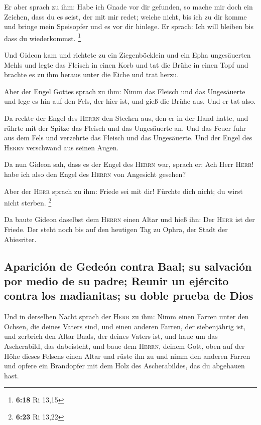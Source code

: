  Er aber sprach zu ihm: Habe ich Gnade vor dir gefunden,
so mache mir doch ein Zeichen, dass du es seist, der mit mir redet;
 weiche nicht, bis ich zu dir komme und bringe mein
Speisopfer und es vor dir hinlege. Er sprach: Ich will bleiben bis dass
du wiederkommst. \footnote{\textbf{6:18} Ri 13,15}

 Und Gideon kam und richtete zu ein Ziegenböcklein und
ein Epha ungesäuerten Mehls und legte das Fleisch in einen Korb und tat
die Brühe in einen Topf und brachte es zu ihm heraus unter die Eiche und
trat herzu.

 Aber der Engel Gottes sprach zu ihm: Nimm das Fleisch
und das Ungesäuerte und lege es hin auf den Fels, der hier ist, und gieß
die Brühe aus. Und er tat also.

 Da reckte der Engel des \textsc{Herrn} den Stecken aus,
den er in der Hand hatte, und rührte mit der Spitze das Fleisch und das
Ungesäuerte an. Und das Feuer fuhr aus dem Fels und verzehrte das
Fleisch und das Ungesäuerte. Und der Engel des \textsc{Herrn} verschwand
aus seinen Augen.

 Da nun Gideon sah, dass es der Engel des \textsc{Herrn}
war, sprach er: Ach Herr \textsc{Herr}! habe ich also den Engel des
\textsc{Herrn} von Angesicht gesehen?

 Aber der \textsc{Herr} sprach zu ihm: Friede sei mit
dir! Fürchte dich nicht; du wirst nicht sterben. \footnote{\textbf{6:23}
  Ri 13,22}

 Da baute Gideon daselbst dem \textsc{Herrn} einen Altar
und hieß ihn: Der \textsc{Herr} ist der Friede. Der steht noch bis auf
den heutigen Tag zu Ophra, der Stadt der Abiesriter.

\hypertarget{apariciuxf3n-de-gedeuxf3n-contra-baal-su-salvaciuxf3n-por-medio-de-su-padre-reunir-un-ejuxe9rcito-contra-los-madianitas-su-doble-prueba-de-dios}{%
\subsection{Aparición de Gedeón contra Baal; su salvación por medio de
su padre; Reunir un ejército contra los madianitas; su doble prueba de
Dios}\label{apariciuxf3n-de-gedeuxf3n-contra-baal-su-salvaciuxf3n-por-medio-de-su-padre-reunir-un-ejuxe9rcito-contra-los-madianitas-su-doble-prueba-de-dios}}

 Und in derselben Nacht sprach der \textsc{Herr} zu ihm:
Nimm einen Farren unter den Ochsen, die deines Vaters sind, und einen
anderen Farren, der siebenjährig ist, und zerbrich den Altar Baals, der
deines Vaters ist, und haue um das Ascherabild, das dabeisteht,
 und baue dem \textsc{Herrn}, deinem Gott, oben auf der
Höhe dieses Felsens einen Altar und rüste ihn zu und nimm den anderen
Farren und opfere ein Brandopfer mit dem Holz des Ascherabildes, das du
abgehauen hast.

